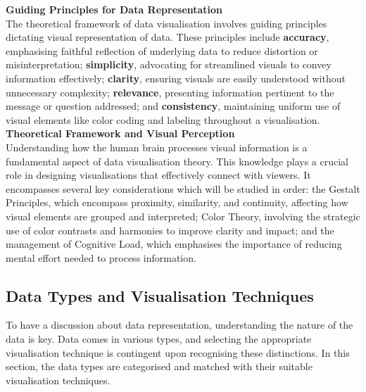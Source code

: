 \documentclass{article}\usepackage[]{graphicx}\usepackage[]{xcolor}
\numberwithin{equation}{section}
\begin{document}
\noindent \textbf{Guiding Principles for Data Representation}\\
The theoretical framework of data visualisation involves guiding principles dictating visual representation of data. These principles include \textbf{accuracy}, emphasising faithful reflection of underlying data to reduce distortion or misinterpretation; \textbf{simplicity}, advocating for streamlined visuals to convey information effectively; \textbf{clarity}, ensuring visuals are easily understood without unnecessary complexity; \textbf{relevance}, presenting information pertinent to the message or question addressed; and \textbf{consistency}, maintaining uniform use of visual elements like color coding and labeling throughout a visualisation.\\

\noindent \textbf{Theoretical Framework and Visual Perception}\\
Understanding how the human brain processes visual information is a fundamental aspect of data visualisation theory. This knowledge plays a crucial role in designing visualisations that effectively connect with viewers. It encompasses several key considerations which will be studied in order: the Gestalt Principles, which encompass proximity, similarity, and continuity, affecting how visual elements are grouped and interpreted; Color Theory, involving the strategic use of color contrasts and harmonies to improve clarity and impact; and the management of Cognitive Load, which emphasises the importance of reducing mental effort needed to process information.

\subsection{Data Types and Visualisation Techniques}
To have a discussion about data representation, understanding the nature of the data is key. Data comes in various types, and selecting the appropriate visualisation technique is contingent upon recognising these distinctions. In this section, the data types are categorised and matched with their suitable visualisation techniques.
\end{document}
